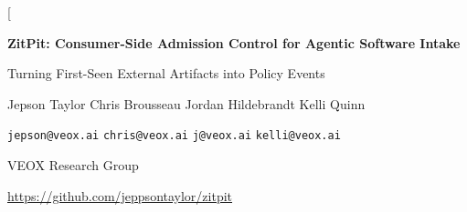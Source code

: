 \documentclass[conference]{IEEEtran}
\newcommand{\product}{ZitPit}
\begin{document}
\twocolumn[
\begin{@twocolumnfalse}
\begin{center}
{\LARGE\bfseries \product: Consumer-Side Admission Control for Agentic Software Intake\par}
\vspace{0.15em}
{\large Turning First-Seen External Artifacts into Policy Events\par}
\vspace{0.28em}
{\normalsize Jepson Taylor \hspace{0.75em} Chris Brousseau \hspace{0.75em} Jordan Hildebrandt \hspace{0.75em} Kelli Quinn\par}
\vspace{0.04em}
{\small \texttt{jepson@veox.ai} \hspace{0.55em} \texttt{chris@veox.ai} \hspace{0.55em} \texttt{j@veox.ai} \hspace{0.55em} \texttt{kelli@veox.ai}\par}
\vspace{0.10em}
{\small VEOX Research Group\par}
{\small \url{https://github.com/jeppsontaylor/zitpit}\par}
\vspace{0.22em}
\end{center}

\begin{abstract}
AI IDEs and coding agents compress discovery, fetch, workspace open, installation, and execution into one low-observability loop. Existing defenses such as provenance frameworks, package and repository firewalls, runtime protection, and tool-approval prompts each cover part of that path, but they often leave the final consumer-side execution decision implicit. \product{} is a 100\% open-source Rust system that argues for a stricter boundary: first-seen external artifacts should become durable policy events before they gain execution rights on protected developer or CI hosts. The current public evidence is intentionally narrow and explicit. It includes repeated Git smart-HTTP intake measurements showing that approved artifacts can remain faster than unmanaged public fetch, plus implemented protected-session and governed-egress proof families. The broader contribution is architectural rather than universal-coverage-by-assertion: \product{} unifies artifact admission, repo-open state, capability-scoped execution, and durable policy records at the consumer execution boundary for agentic workflows.
\end{abstract}


\end{@twocolumnfalse}
\end{document}

